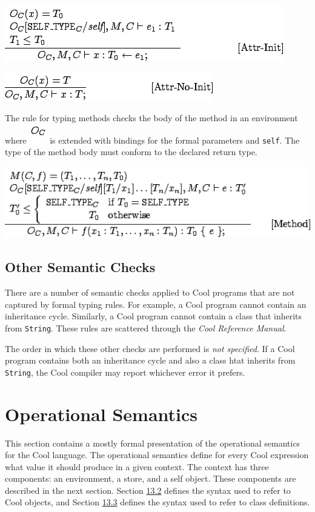 \documentclass[]{article}
\begin{document}
\includegraphics{img112.png}

\includegraphics{img113.png}

The rule for typing methods checks the body of the method in an
environment where \includegraphics{img109.png} is extended with bindings
for the formal parameters and \texttt{self}. The type of the method body
must conform to the declared return type.

\includegraphics{img114.png}

\subsection{Other Semantic Checks}

There are a number of semantic checks applied to Cool programs that are
not captured by formal typing rules. For example, a Cool program cannot
contain an inheritance cycle. Similarly, a Cool program cannot contain a
class that inherits from \texttt{String}. These rules are scattered
through the \emph{Cool Reference Manual}.

The order in which these other checks are performed is \emph{not
specified}. If a Cool program contains both an inheritance cycle and
also a class htat inherits from \texttt{String}, the Cool compiler may
report whichever error it prefers.

\section{Operational Semantics}

This section contains a mostly formal presentation of the operational
semantics for the Cool language. The operational semantics define for
every Cool expression what value it should produce in a given context.
The context has three components: an environment, a store, and a self
object. These components are described in the next section. Section
\href{node46.html\#objectsyntax}{13.2} defines the syntax used to refer
to Cool objects, and Section \href{node47.html\#classdefs}{13.3} defines
the syntax used to refer to class definitions.
\end{document}
